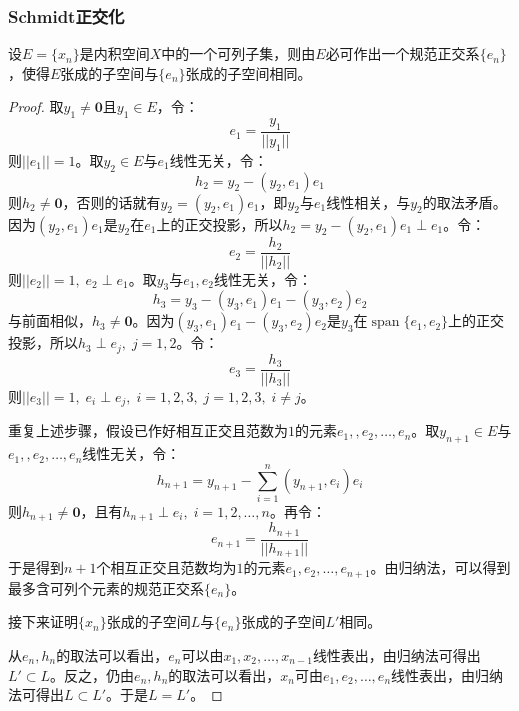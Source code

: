 \subsubsection{Schmidt正交化}
\begin{theorem}[Schmidt正交化]
	设$E=\{x_n\}$是内积空间$X$中的一个可列子集，则由$E$必可作出一个规范正交系$\{e_n\}$，使得$E$张成的子空间与$\{e_n\}$张成的子空间相同。
\end{theorem}
\begin{proof}
	取$y_1\ne\mathbf{0}$且$y_1\in E$，令：
	\begin{equation*}
		e_1=\frac{y_1}{||y_1||}
	\end{equation*}
	则$||e_1||=1$。取$y_2\in E$与$e_1$线性无关，令：
	\begin{equation*}
		h_2=y_2-(y_2,e_1)e_1
	\end{equation*}
	则$h_2\ne\mathbf{0}$，否则的话就有$y_2=(y_2,e_1)e_1$，即$y_2$与$e_1$线性相关，与$y_2$的取法矛盾。因为$(y_2,e_1)e_1$是$y_2$在$e_1$上的正交投影，所以$h_2=y_2-(y_2,e_1)e_1\perp e_1$。令：
	\begin{equation*}
		e_2=\frac{h_2}{||h_2||}
	\end{equation*}
	则$||e_2||=1,\;e_2\perp e_1$。取$y_3$与$e_1,e_2$线性无关，令：
	\begin{equation*}
		h_3=y_3-(y_3,e_1)e_1-(y_3,e_2)e_2
	\end{equation*}
	与前面相似，$h_3\ne\mathbf{0}$。因为$(y_3,e_1)e_1-(y_3,e_2)e_2$是$y_3$在$\operatorname{span}\{e_1,e_2\}$上的正交投影，所以$h_3\perp e_j,\;j=1,2$。令：
	\begin{equation*}
		e_3=\frac{h_3}{||h_3||}
	\end{equation*}
	则$||e_3||=1,\;e_i\perp e_j,\;i=1,2,3,\;j=1,2,3,\;i\ne j$。\par
	重复上述步骤，假设已作好相互正交且范数为$1$的元素$e_1,,e_2,\dots,e_{n}$。取$y_{n+1}\in E$与$e_1,,e_2,\dots,e_{n}$线性无关，令：
	\begin{equation*}
		h_{n+1}=y_{n+1}-\sum_{i=1}^{n}(y_{n+1},e_i)e_i
	\end{equation*}
	则$h_{n+1}\ne\mathbf{0}$，且有$h_{n+1}\perp e_i,\;i=1,2,\dots,n$。再令：
	\begin{equation*}
		e_{n+1}=\frac{h_{n+1}}{||h_{n+1}||}
	\end{equation*}
	于是得到$n+1$个相互正交且范数均为$1$的元素$e_1,e_2,\dots,e_{n+1}$。由归纳法，可以得到最多含可列个元素的规范正交系$\{e_n\}$。\par
	接下来证明$\{x_n\}$张成的子空间$L$与$\{e_n\}$张成的子空间$L'$相同。\par
	从$e_n,h_n$的取法可以看出，$e_n$可以由$x_1,x_2,\dots,x_{n-1}$线性表出，由归纳法可得出$L'\subset L$。反之，仍由$e_n,h_n$的取法可以看出，$x_n$可由$e_1,e_2,\dots,e_n$线性表出，由归纳法可得出$L\subset L'$。于是$L=L'$。
\end{proof}
